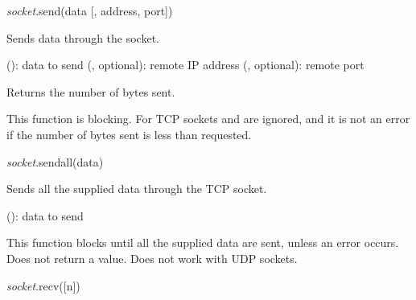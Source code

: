 \documentclass[a4paper,12pt,twoside,extrafontsizes]{memoir}
\begin{document}

\begin{luafuncprototype}
	\emph{socket}.send(data [, address, port])
\end{luafuncprototype}

\begin{funcdescr}
	Sends data through the socket.
\end{funcdescr}

\begin{funcparams}
	 (): data to send
	 (, optional): remote IP address
	 (, optional): remote port
\end{funcparams}

\begin{funcret}
	Returns the number of bytes sent.
\end{funcret}

\begin{funcremarks}
	This function is blocking. For TCP sockets  and  are ignored, and it is not an error if the number of bytes sent is less than requested.
\end{funcremarks}


\begin{luafuncprototype}
	\emph{socket}.sendall(data)
\end{luafuncprototype}

\begin{funcdescr}
	Sends all the supplied data through the TCP socket.
\end{funcdescr}

\begin{funcparams}
	 (): data to send
\end{funcparams}

\begin{funcremarks}
	This function blocks until all the supplied data are sent, unless an error occurs. Does not return a value. Does not work with UDP sockets.
\end{funcremarks}


\begin{luafuncprototype}
	\emph{socket}.recv([n])
\end{luafuncprototype}
\end{document}
